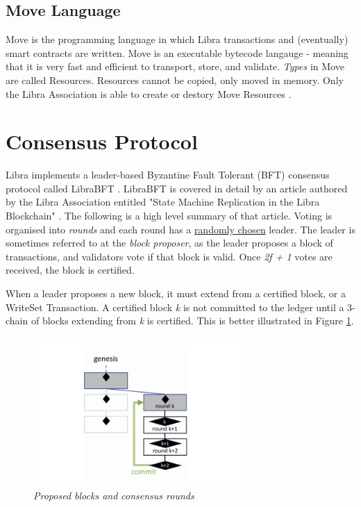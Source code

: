 \documentclass[12pt,openany,a4paper]{book}
\begin{document}
\subsection{Move Language}
\label{kc_move}
Move is the programming language in which Libra transactions and (eventually) 
smart contracts are written. Move is an executable bytecode langauge - meaning that it 
is very fast and efficient to transport, store, and validate.
\textit{Types} in Move are called Resources. Resources cannot be copied, only moved 
in memory. Only the Libra Association is able to create or destory Move Resources \cite{libra_move}.

\section{Consensus Protocol}
\label{consensus_protocol}
Libra implements a leader-based Byzantine Fault Tolerant (BFT) consensus protocol called LibraBFT \cite{libra_technical_paper}.
LibraBFT is covered in detail by an article authored by the Libra Association 
entitled "State Machine Replication in the Libra Blockchain" \cite{libra_smr}. 
The following is a high level summary of that article.
Voting is organised into \textit{rounds} and each round has a \underline{randomly chosen}
leader. The leader is sometimes referred to at the \textit{block proposer}, as the leader 
proposes a block of transactions, and validators vote if that block is valid.
Once \textit{2f + 1} votes are received, the block is certified.

When a leader proposes a new block, it must extend from a certified block, or 
a WriteSet Transaction. A certified block \textit{k} is not committed to the ledger until 
a 3-chain of blocks extending from \textit{k} is certified. This is better illustrated in
Figure \ref{3_chain}.

\begin{figure}[h]
    \caption{\sl Proposed blocks and consensus rounds \cite{libra_smr}}
    \label{3_chain}
    \begin{center}
    \includegraphics[width=0.7\textwidth]{imgs/3_chain.png}
    \end{center}
\end{figure}
\end{document}
